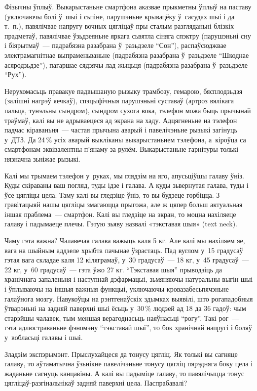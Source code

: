 Фізычны ўплыў. Выкарыстаньне смартфона аказвае прыкметны ўплыў на паставу (уключаючы болі ў~шыі і сьпіне, парушэньне крывацёку ў~сасудах шыі і да т.~п.), павялічвае напругу вочных цягліцаў пры сталым разгляданьні блізкіх прадметаў, павялічвае ўзьдзеяньне яркага сьвятла сіняга спэктру (парушэньні сну і біярытмаў~--- падрабязна разабрана ў~разьдзеле ``Сон''), распаўсюджвае электрамагнітнае выпраменьваньне (падрабязна разабрана ў~разьдзеле ``Шкоднае асяродзьдзе''), пагаршае сядзячы лад жыцьця (падрабязна разабрана ў~разьдзеле ``Рух'').

Нерухомасьць правакуе падвышаную рызыку трамбозу, гемарою, бясплодзьдзя (залішні нагрэў яечкаў), спэцыфічныя парушэньні суставаў (артроз вялікага пальца, тунэльны сындром), сындром сухога вока, тэлефон можа быць прычынай траўмаў, калі вы не адрываецеся ад экрана на хаду. Адцягненьне на тэлефон падчас кіраваньня~--- частая прычына аварый і павелічэньне рызыкі загінуць у~ДТЗ. Да 24\,\% усіх аварый выкліканы выкарыстаньнем тэлефона, а~кіроўца са смартфонам эквівалентны п'янаму за рулём. Выкарыстаньне гарнітуры толькі нязначна зьніжае рызыкі.

Калі мы трымаем тэлефон у~руках, мы глядзім на яго, апусьціўшы галаву ўніз. Куды скіраваны ваш погляд, туды ідзе і галава. А куды зьвернутая галава, туды і ўсе цягліцы цела. Таму калі вы гледзіце ўніз, то вы будзеце горбіцца. З гравітацыяй нашы цягліцы змагаюцца прыгожа, але ж цяпер больш актуальная іншая праблема~--- смартфон. Калі вы гледзіце на экран, то моцна нахіляеце галаву і падымаеце плечы. Гэтую зьяву назвалі «тэкставая шыя» (text neck).

Чаму гэта важна? Чалавечая галава важыць каля 5 кг. Але калі мы нахіляем яе, вага на шыйным аддзеле хрыбта пачынае ўзрастаць. Пад вуглом у~15 градусаў гэтая вага складае каля 12 кіляграмаў, у~30 градусаў~--- 18 кг, у~45 градусаў~--- 22 кг, у~60 градусаў~--- гэта ўжо 27 кг. ``Тэкставая шыя'' прыводзіць да хранічнага запаленьня і наступнай дэфармацыі, зьмяняючы натуральны выгін шыі і ўплываючы на іншыя важныя функцыі, уключаючы кровазабесьпячэньне галаўнога мозгу. Навукоўцы на рэнтгенаўскіх здымках выявілі, што рогападобныя ўтварэньні на задняй паверхні шыі ёсьць у~30\,\% людзей ад 18 да 36 гадоў: чым старэйшы чалавек, тым меншая верагоднасьць наяўнасьці ``рогу''. Такі рог~--- гэта адлюстраваньне фэномэну ``тэкставай шыі'', то бок хранічнай напругі і боляў у~вобласьці галавы і шыі.

Зладзім экспэрымэнт. Прыслухайцеся да тонусу цягліц. Як толькі вы сагняце галаву, то аўтаматычна ўзьнікне павелічэньне тонусу цягліц пярэдняга боку цела і жаданьне сагнуць канцавіны. А калі вы падыміце галаву, то павялічыцца тонус цягліцаў-разгінальнікаў задняй паверхні цела. Паспрабавалі?

